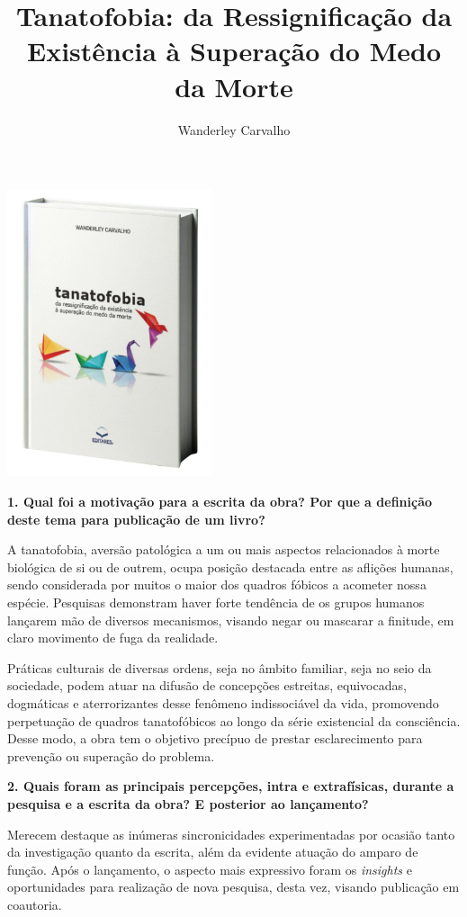 \documentclass{gescons}
\author{Wanderley Carvalho}
\title{Tanatofobia: da Ressignificação da Existência à Superação do Medo da Morte}
\begin{document}
    \makeentrevistatitle

    \begin{multicols}{2}

\begin{center}
    \vspace{-0.5cm}
    \includegraphics[width=6cm]{articles/entrevista/mockups/Wanderley_Carvalho.png}
\end{center}


\textbf{1. Qual foi a motivação para a escrita da obra? Por que a definição deste tema para publicação de um livro?}


A tanatofobia, aversão patológica a um ou mais aspectos relacionados à
morte biológica de si ou de outrem, ocupa posição destacada entre as
aflições humanas, sendo considerada por muitos o maior dos quadros
fóbicos a acometer nossa espécie. Pesquisas demonstram haver forte
tendência de os grupos humanos lançarem mão de diversos mecanismos,
visando negar ou mascarar a finitude, em claro movimento de fuga da
realidade.

Práticas culturais de diversas ordens, seja no âmbito familiar, seja no
seio da sociedade, podem atuar na difusão de concepções estreitas,
equivocadas, dogmáticas e aterrorizantes desse fenômeno indissociável da
vida, promovendo perpetuação de quadros tanatofóbicos ao longo da série
existencial da consciência. Desse modo, a obra tem o objetivo precípuo
de prestar esclarecimento para prevenção ou superação do problema.

\textbf{2. Quais foram as principais percepções, intra e extrafísicas, durante a pesquisa e a escrita da obra? E posterior ao lançamento?}

Merecem destaque as inúmeras sincronicidades experimentadas por ocasião
tanto da investigação quanto da escrita, além da evidente atuação do
amparo de função. Após o lançamento, o aspecto mais expressivo foram os
\emph{insights} e oportunidades para realização de nova pesquisa, desta
vez, visando publicação em coautoria.


\end{multicols}
\end{document}
